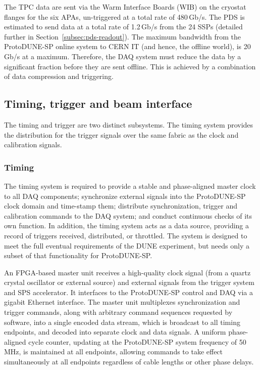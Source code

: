 The TPC data are sent via the Warm Interface Boards  (WIB) on the cryostat flanges
for the six APAs, un-triggered at a total rate of 480\,Gb/s.  
The PDS is estimated to send data
at a total rate of 1.2\,Gb/s from the 24 SSPs (detailed further in Section~\ref{subsec:pds-readout}).
The maximum bandwidth from the ProtoDUNE-SP online system to CERN IT (and
hence, the offline world), is 20\,Gb/s at a maximum.
Therefore, the DAQ system must reduce the data by a significant fraction
before they are sent offline.  This is achieved by a combination of
data compression and triggering.

\subsection{Timing, trigger and beam interface}
\label{sec:daq_time}

The timing and trigger are two distinct subsystems.  The timing
system provides the distribution for the trigger signals over the same
fabric as the clock and calibration signals.  %

\subsubsection{Timing}


The timing system is required to provide a stable and phase-aligned
master clock to all DAQ components; synchronize external signals into the
ProtoDUNE-SP clock domain and time-stamp them; distribute synchronization,
trigger and calibration commands to the DAQ system; and conduct continuous
checks of its own function. In addition, the timing system acts as a
data source, providing a record of triggers received, distributed, or
throttled. The system is designed to meet the full eventual requirements
of the DUNE experiment, but needs only a subset of that functionality
for ProtoDUNE-SP. 

An FPGA-based master unit 
receives a high-quality clock signal 
(from a quartz crystal oscillator or external source) 
and external signals from the
trigger system and SPS accelerator. It interfaces to the ProtoDUNE-SP control
and DAQ via a gigabit Ethernet interface. The master unit multiplexes
synchronization and trigger commands, along with arbitrary command
sequences requested by software, into a single encoded data stream,
which is broadcast to all timing endpoints, and decoded into separate clock
and data signals. A uniform phase-aligned cycle counter, updating at the
ProtoDUNE-SP system frequency of 50\,MHz, is maintained at all endpoints,
allowing commands to take effect simultaneously at all endpoints
regardless of cable lengths or other phase delays.

